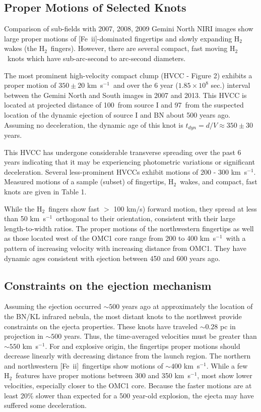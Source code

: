 \documentclass[12pt,preprint]{aastex}
\newcommand{\kms}{km~s{$^{-1}$}}
\newcommand{\Feii}{[Fe~{\sc ii}]}
\newcommand{\hh}{\ensuremath{\textrm{H}_{2}}}			%
\begin{document}
\subsection{Proper Motions of Selected Knots}

Comparison of sub-fields with 2007, 2008, 2009 Gemini North NIRI images show large
proper motions of  \Feii -dominated fingertips and slowly expanding  \hh 
wakes (the  \hh\ fingers).  However, there are several compact, fast moving \hh\  
knots which have sub-arc-second to arc-second diameters. 

The most prominent high-velocity compact clump (HVCC - Figure 2) exhibits a proper 
motion of $350 \pm 20$ \kms\ and over the 6 year ($1.85 \times 10^8$ sec.)  interval
between the Gemini North and South images in 2007 and 2013.  This HVCC 
is located at projected  distance of 100\arcsec\ from source I and 97\arcsec\ from 
the suspected location of the dynamic ejection of source I and BN about 500 years ago.
Assuming no deceleration, the dynamic age of this knot is 
$t_{dyn} = d / V \approx  350 \pm 30$ years.   

This HVCC  has undergone considerable  transverse spreading over the past 6 years 
indicating that it may be experiencing photometric variations or  significant deceleration.    
Several less-prominent HVCCs exhibit motions of 200 - 300 \kms . 
Measured motions of a sample (subset) of fingertips, \hh\  wakes, and compact, fast
knots are given  in Table 1.    

While the \hh\ fingers show fast $>$ 100 km/s) forward motion, 
they spread at less than  50 \kms\  orthogonal to their orientation, consistent with their
large length-to-width ratios.   The proper motions of the northwestern fingertips as well as
those located west of the OMC1 core range from 200 to 400 \kms\ with a pattern of
increasing velocity with increasing distance from OMC1.   They  have dynamic
ages consistent with ejection between 450 and 600 years ago.


\subsection{Constraints on the ejection mechanism}

Assuming the ejection occurred $\sim500$ years ago at approximately the
location of the BN/KL infrared nebula, the most distant knots to the northwest provide 
constraints on the ejecta properties.  These knots have traveled
$\sim0.28$ pc in projection in $\sim500$ years.  Thus,  the time-averaged 
velocities must be greater than   $\sim550$ \kms.   For and explosive origin, 
the fingertips proper motions should decrease linearly with decreasing distance 
from the launch region.   The northern and northwestern \Feii\ fingertips show motions
of $\sim 400$ \kms  .   While a few \hh\ features have proper motions between 300
and 350 \kms , most show lower velocities, especially closer to the OMC1 core.   
Because the faster motions are at least 20\% slower than expected for a 500 
year-old explosion,   the ejecta may have suffered some deceleration.   
\end{document}
